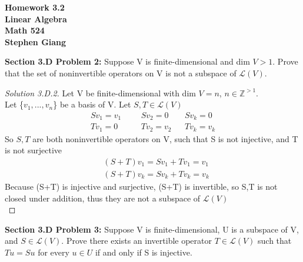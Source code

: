 \documentclass[12pt]{article}
\begin{document}
	
	\begin{center}
		\textbf{Homework 3.2} \\
		\textbf{Linear Algebra} \\
		\textbf{Math 524} \\
		\textbf{Stephen Giang} \\
	\end{center}

\noindent \textbf{Section 3.D Problem 2: } Suppose V is finite-dimensional and dim $V > 1$. Prove that the set of
noninvertible operators on V is not a subspace of $\mathcal{L} (V)$.

	\begin{proof}[Solution 3.D.2]
		Let V be finite-dimensional with dim $V = n$, \quad $n \in \mathbb{Z}^{> 1}$. \\
		Let \{$v_1, ..., v_n$\} be a basis of V. Let $S,T \in \mathcal{L}(V)$
		\begin{align*}
			Sv_1 = v_1 &&& Sv_2 = 0 && Sv_k = 0 \\
			Tv_1 = 0 &&& Tv_2 = v_2 && Tv_k = v_k 
		\end{align*}
		So $S,T$ are both noninvertible operators on V, such that S is not injective, and T is not surjective
		\begin{align*}
			&(S+T)v_1 = Sv_1 + Tv_1 = v_1 \\
			&(S+T)v_k = Sv_k + Tv_k = v_k 
		\end{align*}
		Because (S+T) is injective and surjective, (S+T) is invertible, so S,T is not closed under addition, thus they are not a subspace of $\mathcal{L}(V)$ \\
	\end{proof}

\vspace{\baselineskip}
\vspace{\baselineskip}

\noindent \textbf{Section 3.D Problem 3: } Suppose V is finite-dimensional, U is a subspace of V, and $S \in \mathcal{L}(V)$. Prove there exists an invertible operator $T \in \mathcal{L}(V)$ such that $Tu = Su$ for every $u \in U$ if and only if S is injective.
\end{document}
